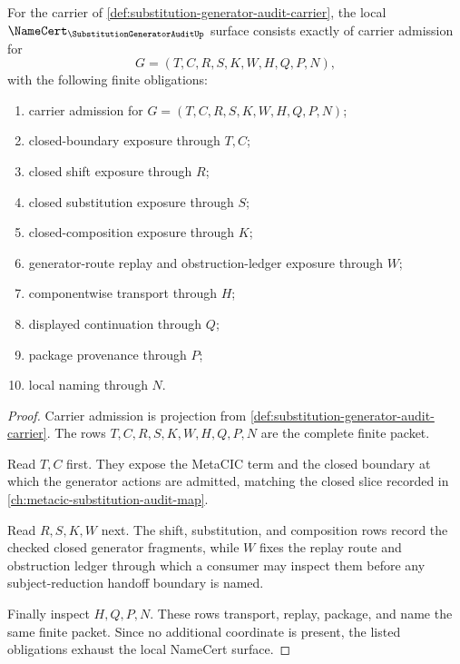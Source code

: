 \begin{theorem}
\label{thm:substitution-generator-audit-namecert-obligations}
For the carrier of \autoref{def:substitution-generator-audit-carrier}, the local $\NameCert_{\SubstitutionGeneratorAuditUp}$ surface consists exactly of carrier admission for
$$
G=(T,C,R,S,K,W,H,Q,P,N),
$$
with the following finite obligations:
\begin{enumerate}
\item carrier admission for $G=(T,C,R,S,K,W,H,Q,P,N)$;
\item closed-boundary exposure through $T,C$;
\item closed shift exposure through $R$;
\item closed substitution exposure through $S$;
\item closed-composition exposure through $K$;
\item generator-route replay and obstruction-ledger exposure through $W$;
\item componentwise transport through $H$;
\item displayed continuation through $Q$;
\item package provenance through $P$;
\item local naming through $N$.
\end{enumerate}
\end{theorem}
\begin{proof}
Carrier admission is projection from \autoref{def:substitution-generator-audit-carrier}. The rows $T,C,R,S,K,W,H,Q,P,N$ are the complete finite packet.

Read $T,C$ first. They expose the MetaCIC term and the closed boundary at which the generator actions are admitted, matching the closed slice recorded in \autoref{ch:metacic-substitution-audit-map}.

Read $R,S,K,W$ next. The shift, substitution, and composition rows record the checked closed generator fragments, while $W$ fixes the replay route and obstruction ledger through which a consumer may inspect them before any subject-reduction handoff boundary is named.

Finally inspect $H,Q,P,N$. These rows transport, replay, package, and name the same finite packet. Since no additional coordinate is present, the listed obligations exhaust the local NameCert surface.
\end{proof}

